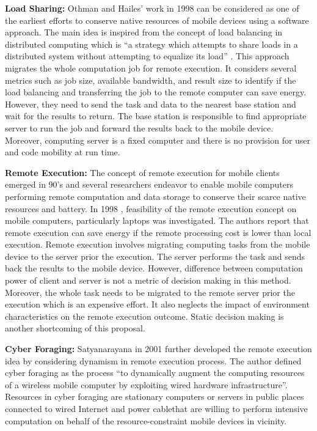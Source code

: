 \documentclass[publish]{IEEEtran}
\begin{document}
\textbullet \textbf{ Load Sharing:} Othman and Hailes' work \cite{Othman:1998:PCS:584007.584011} in 1998 can be considered as one of the earliest efforts to conserve native resources of mobile devices using a software approach. The main idea is inspired from the concept of load balancing in distributed computing which is ``a strategy which attempts to share loads in a distributed system without attempting to equalize its load'' \cite{Othman:1998:PCS:584007.584011}. This approach migrates the whole computation job for remote execution. It considers several metrics such as job size, available bandwidth, and result size to identify if the load balancing and transferring the job to the remote computer can save energy. However, they need to send the task and data to the nearest base station and wait for the results to return. The base station is responsible to find appropriate server to run the job and forward the results back to the mobile device. Moreover, computing server is a fixed computer and there is no provision for user and code mobility at run time.

\textbullet \textbf{ Remote Execution:} The concept of remote execution for mobile clients emerged in 90’s and several researchers \cite{ Athan1993, Rudenko1998a, Bakre1995, Rudenko1999, Wrabetz1995} endeavor to enable mobile computers performing remote computation and data storage to conserve their scarce native resources and battery. In 1998 \cite{Rudenko1998a}, feasibility of the remote execution concept on mobile computers, particularly laptops was investigated. The authors report that remote execution can save energy if the remote processing cost is lower than local execution. Remote execution involves migrating computing tasks from the mobile device to the server prior the execution. The server performs the task and sends back the results to the mobile device. However, difference between computation power of client and server is not a metric of decision making in this method. Moreover, the whole task needs to be migrated to the remote server prior the execution which is an expensive effort. It also neglects the impact of environment characteristics on the remote execution outcome. Static decision making is another shortcoming of this proposal.

\textbullet \textbf{ Cyber Foraging:} Satyanarayana in 2001 \cite{Satyanarayanan2001} further developed the remote execution idea by considering dynamism in remote execution process. The author defined cyber foraging as the process ``to dynamically augment the computing resources of a wireless mobile computer by exploiting wired hardware infrastructure''. Resources in cyber foraging are stationary computers or servers in public places \textemdash connected to wired Internet and power cable\textemdash that are willing to perform intensive computation on behalf of the resource-constraint mobile devices in vicinity. 
\end{document}
